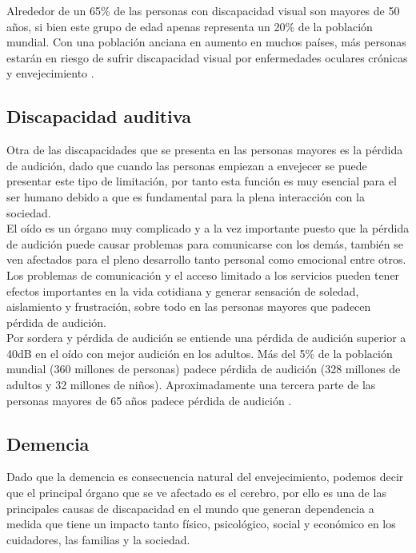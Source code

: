 Alrededor de un 65\% de las personas con discapacidad visual son mayores de 50 años, si bien este grupo de edad apenas representa un 20\% de la población mundial. Con una población anciana en aumento en muchos países, más personas estarán en riesgo de sufrir discapacidad visual por enfermedades oculares crónicas y envejecimiento \cite{seis}.

\subsection{Discapacidad auditiva}

Otra de las discapacidades que se presenta en las personas mayores es la pérdida de audición, dado que cuando las personas empiezan a envejecer se puede presentar este tipo de limitación, por tanto esta función es muy esencial para el ser humano debido a que es fundamental para la plena interacción con la sociedad. \\

El oído es un órgano muy complicado y a la vez importante puesto que la pérdida de audición puede causar problemas para comunicarse con los demás, también se ven afectados para el pleno desarrollo tanto personal como emocional entre otros. \\

Los problemas de comunicación y el acceso limitado a los servicios pueden tener efectos importantes en la vida cotidiana y generar sensación de soledad, aislamiento y frustración, sobre todo en las personas mayores que padecen pérdida de audición. \\
Por sordera y pérdida de audición se entiende una pérdida de audición superior a 40dB en el oído con mejor audición en los adultos. Más del 5\% de la población mundial (360 millones de personas) padece pérdida de audición (328 millones de adultos y 32 millones de niños). Aproximadamente una tercera parte de las personas mayores de 65 años padece pérdida de audición \cite{siete}.

\subsection{Demencia}

Dado que la demencia es consecuencia natural del envejecimiento, podemos decir que el principal órgano que se ve afectado es el cerebro, por ello es una de las principales causas de discapacidad en el mundo que generan dependencia a medida que tiene un impacto tanto físico, psicológico, social y económico en los cuidadores, las familias y la sociedad. \\

